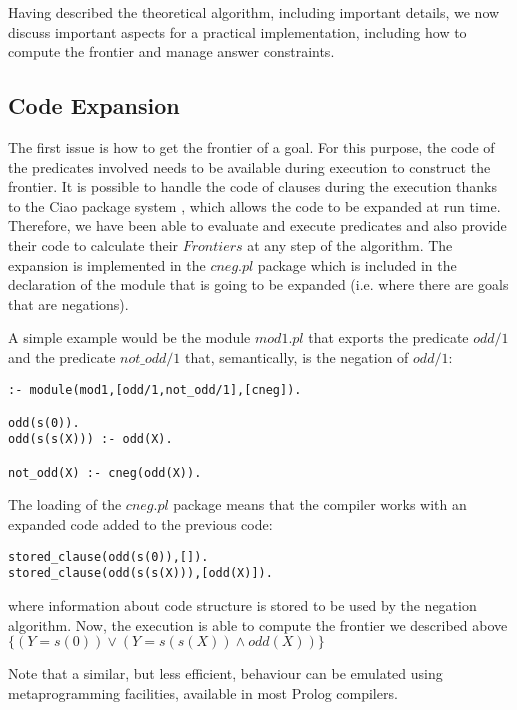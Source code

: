 \documentclass{llncs}
\begin{document}
Having described the theoretical algorithm, including important
details, we now discuss important aspects for a practical
implementation, including how to compute the frontier and manage
answer constraints.


\subsection{Code Expansion}
\label{expansion}

The first issue is how to get the frontier of a goal. For this
purpose, the code of the predicates involved needs to be available
during execution to construct the frontier. It is possible to handle
the code of clauses during the execution thanks to the Ciao package
system \cite{ciao-modules-cl2000}, which allows the code to be
expanded at run time.  Therefore, we have been able to evaluate and
execute predicates and also provide their code to calculate their
$Frontiers$ at any step of the algorithm. The expansion is implemented
in the $cneg.pl$ package which is included in the declaration of
the module that is going to be expanded (i.e. where there are goals
that are negations).

A simple example would be the module $mod1.pl$ that exports the
predicate $odd/1$ and the predicate $not\_odd/1$ that, semantically, is
the negation of $odd/1$:
\begin{verbatim}
:- module(mod1,[odd/1,not_odd/1],[cneg]).

odd(s(0)).
odd(s(s(X))) :- odd(X).

not_odd(X) :- cneg(odd(X)).
\end{verbatim}
The loading of the $cneg.pl$ package means that the compiler works
with an expanded code added to the previous code:
\begin{verbatim}
stored_clause(odd(s(0)),[]).
stored_clause(odd(s(s(X))),[odd(X)]).
\end{verbatim}
where information about code structure is stored to be used by the
negation algorithm. Now, the execution is able to compute the frontier
we described above $\{ ( Y=s(0) ) \vee ( Y=s(s(X)) \wedge odd(X) ) \}$

Note that a similar, but less efficient, behaviour can be emulated
using metaprogramming facilities, available in most Prolog compilers.
 

\end{document}
